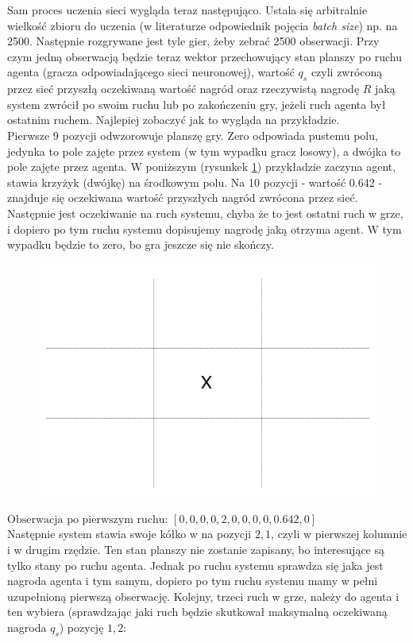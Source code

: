 \documentclass[licencjacka]{pracamgr}
\begin{document}
Sam proces uczenia sieci wygląda teraz następująco. Ustala się arbitralnie wielkość zbioru do uczenia (w literaturze odpowiednik pojęcia \textit{batch size}) np. na 2500. Następnie rozgrywane jest tyle gier, żeby zebrać 2500 obserwacji. Przy czym jedną obserwacją będzie teraz wektor przechowujący stan planszy po ruchu agenta (gracza odpowiadającego sieci neuronowej), wartość $q_{s}$ czyli zwróconą przez sieć przyszłą oczekiwaną wartość nagród  oraz rzeczywistą nagrodę $R$  jaką system zwrócił po swoim ruchu lub po zakończeniu gry, jeżeli ruch agenta był ostatnim ruchem. Najlepiej zobaczyć jak to wygląda na przykładzie.\\

Pierwsze 9 pozycji odwzorowuje planszę gry. Zero odpowiada pustemu polu, jedynka to pole zajęte przez system (w tym wypadku gracz losowy), a dwójka to pole zajęte przez agenta.
W poniższym (rysunkek \ref{Rys27}) przykładzie zaczyna agent, stawia krzyżyk (dwójkę) na środkowym polu. Na 10 pozycji  - wartość 0.642  - znajduje się oczekiwana wartość przyszłych nagród zwrócona przez sieć. Następnie jest oczekiwanie na ruch systemu, chyba że to jest ostatni ruch w grze, i dopiero po tym ruchu systemu dopisujemy nagrodę jaką otrzyma agent. W tym wypadku będzie to zero, bo gra jeszcze się nie skończy.

 
\begin{figure}[h!]
	\includegraphics [scale=0.2] {ttt_6.png}
	\caption{}
	\label{Rys27}
\end{figure}
$\text{Obserwacja po pierwszym ruchu:  }[0, 0, 0, 0, 2, 0, 0, 0, 0, 0.642, 0]$\\

 Następnie system stawia swoje kółko w na pozycji $2,1$, czyli w pierwszej kolumnie i w drugim rzędzie. Ten stan planszy nie zostanie zapisany, bo interesujące są tylko stany po ruchu agenta. Jednak po ruchu systemu sprawdza się jaka jest nagroda agenta i tym samym, dopiero po tym ruchu systemu mamy w pełni uzupełnioną pierwszą obserwację. Kolejny, trzeci ruch w grze, należy do agenta i ten wybiera (sprawdzając jaki ruch będzie skutkował maksymalną oczekiwaną nagroda $q_{s}$) pozycję $1,2$:
 
\end{document}
